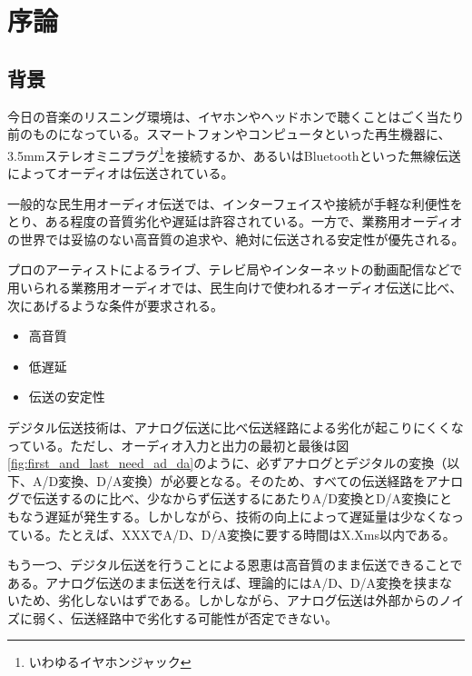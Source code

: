 \chapter{序論}
\label{chap:introduction}

\section{背景}
\label{section:background}

今日の音楽のリスニング環境は、イヤホンやヘッドホンで聴くことはごく当たり前のものになっている。スマートフォンやコンピュータといった再生機器に、3.5mmステレオミニプラグ\footnote{いわゆるイヤホンジャック}を接続するか、あるいはBluetoothといった無線伝送によってオーディオは伝送されている。

一般的な民生用オーディオ伝送では、インターフェイスや接続が手軽な利便性をとり、ある程度の音質劣化や遅延は許容されている。一方で、業務用オーディオの世界では妥協のない高音質の追求や、絶対に伝送される安定性が優先される。

プロのアーティストによるライブ、テレビ局やインターネットの動画配信などで用いられる業務用オーディオでは、民生向けで使われるオーディオ伝送に比べ、次にあげるような条件が要求される。

\begin{itemize}
  \item 高音質
  \item 低遅延
  \item 伝送の安定性
\end{itemize}

デジタル伝送技術は、アナログ伝送に比べ伝送経路による劣化が起こりにくくなっている。ただし、オーディオ入力と出力の最初と最後は図\ref{fig:first_and_last_need_ad_da}のように、必ずアナログとデジタルの変換（以下、A/D変換、D/A変換）が必要となる。そのため、すべての伝送経路をアナログで伝送するのに比べ、少なからず伝送するにあたりA/D変換とD/A変換にともなう遅延が発生する。しかしながら、技術の向上によって遅延量は少なくなっている。たとえば、XXXでA/D、D/A変換に要する時間はX.Xms以内である。


もう一つ、デジタル伝送を行うことによる恩恵は高音質のまま伝送できることである。アナログ伝送のまま伝送を行えば、理論的にはA/D、D/A変換を挟まないため、劣化しないはずである。しかしながら、アナログ伝送は外部からのノイズに弱く、伝送経路中で劣化する可能性が否定できない。

